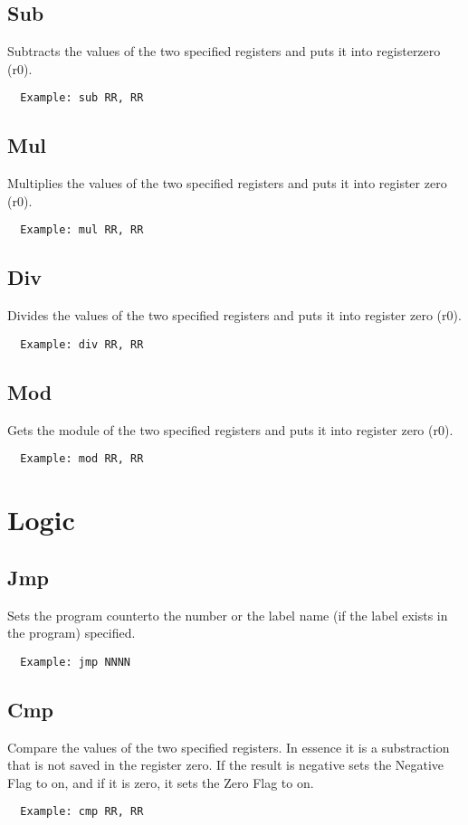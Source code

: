\documentclass[oneside]{book}
\begin{document}
   \subsection{Sub}
  Subtracts the values of the two specified registers and puts it into registerzero (r0).
  \begin{Verbatim}
  Example: sub RR, RR
  \end{Verbatim}
  
   \subsection{Mul}
  Multiplies the values of the two specified registers and puts it into register zero (r0).
  \begin{Verbatim}
  Example: mul RR, RR
  \end{Verbatim}
  
   \subsection{Div}
  Divides the values of the two specified registers and puts it into register zero (r0).
  \begin{Verbatim}
  Example: div RR, RR
  \end{Verbatim}
  
   \subsection{Mod}
  Gets the module of the two specified registers and puts it into register zero (r0).
  \begin{Verbatim}
  Example: mod RR, RR
  \end{Verbatim}
  
    \section{Logic}
   \subsection{Jmp}
  Sets the program counterto the number or the label name (if the label exists in the program) specified.
  \begin{Verbatim}
  Example: jmp NNNN
  \end{Verbatim}
  
   \subsection{Cmp}
  Compare the values of the two specified registers. In essence it is a substraction that is not saved in the register zero. If the result is negative sets the Negative Flag to on, and if it is zero, it sets the Zero Flag to on.
  \begin{Verbatim}
  Example: cmp RR, RR
  \end{Verbatim}
  
\end{document}
